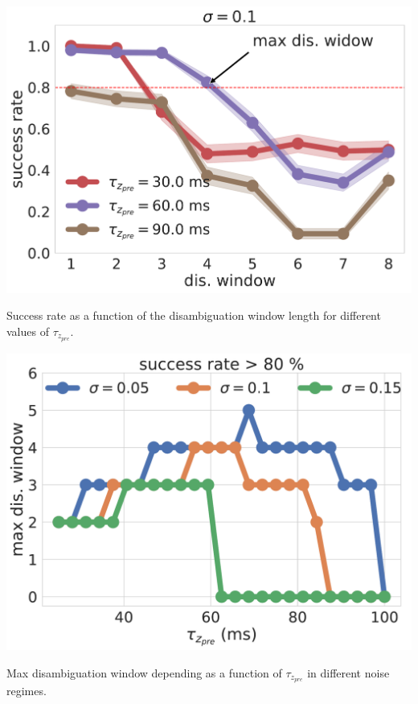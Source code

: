 \documentclass[portrait,a4, final]{baposter}
\begin{document}
\begin{poster}
{\begin{multicols}{2}
\begin{center}
\includegraphics[scale=0.20]{noise2.pdf}

\smaller Success rate as a function of the disambiguation window length for different values of $\tau_{z_{pre}}$.
\end{center}

\begin{center}
\includegraphics[scale=0.20]{noise.pdf}

\smaller Max disambiguation window depending as a function of $\tau_{z_{pre}}$ in different noise regimes. 
\end{center}

\end{multicols}


}
\end{poster}
\end{document}
